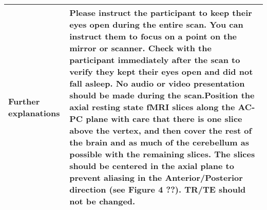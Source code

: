 \begin{tabularx}{\linewidth}{@{} s | X @{}}
Further explanations                              				& Please instruct the participant to keep their eyes open during the entire scan. You can instruct them to focus on a point on the mirror or scanner. Check with the participant immediately after the scan to verify they kept their eyes open and did not fall asleep. No audio or video presentation should be made during the scan.Position the axial resting state fMRI slices along the AC-PC plane with care that there is one slice above the vertex, and then cover the rest of the brain and as much of the cerebellum as possible with the remaining slices. The slices should be centered in the axial plane to prevent aliasing in the Anterior/Posterior direction (see Figure 4 ??). \ac{TR}/\ac{TE} should not be changed. \\
\bottomrule
\end{tabularx}


